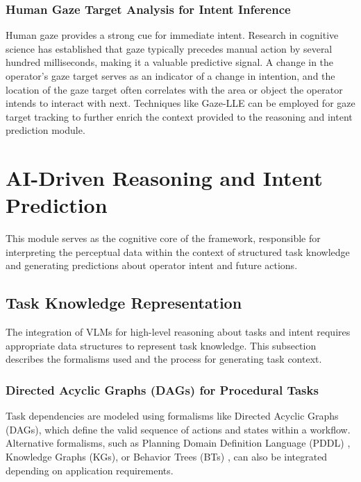 \subsubsection{Human Gaze Target Analysis for Intent Inference}

Human gaze provides a strong cue for immediate intent. Research in cognitive science has established that gaze typically precedes manual action by several hundred milliseconds, making it a valuable predictive signal. A change in the operator's gaze target serves as an indicator of a change in intention, and the location of the gaze target often correlates with the area or object the operator intends to interact with next. Techniques like Gaze-LLE \citep{ryan2024gazelle} can be employed for gaze target tracking to further enrich the context provided to the reasoning and intent prediction module.

\section{AI-Driven Reasoning and Intent Prediction}
\label{sec:ai_reasoning}

This module serves as the cognitive core of the framework, responsible for interpreting the perceptual data within the context of structured task knowledge and generating predictions about operator intent and future actions.

\subsection{Task Knowledge Representation}

The integration of VLMs for high-level reasoning about tasks and intent requires appropriate data structures to represent task knowledge. This subsection describes the formalisms used and the process for generating task context.

\subsubsection{Directed Acyclic Graphs (DAGs) for Procedural Tasks}

Task dependencies are modeled using formalisms like Directed Acyclic Graphs (DAGs), which define the valid sequence of actions and states within a workflow. Alternative formalisms, such as Planning Domain Definition Language (PDDL) \citep{Singh2023}, Knowledge Graphs (KGs), or Behavior Trees (BTs) \citep{Ahn2022, IEEE-Knowledgebased2021}, can also be integrated depending on application requirements.

